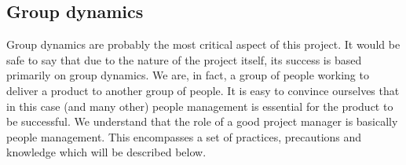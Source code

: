 \subsection{Group dynamics}

Group dynamics are probably the most critical aspect of this project.
It would be safe to say that due to the nature of the project itself, its success is based primarily on group dynamics.
We are, in fact, a group of people working to deliver a product to another group of people.
It is easy to convince ourselves that in this case (and many other) people management is essential for the product to be successful.
We understand that the role of a good project manager is basically people management.
This encompasses a set of practices, precautions and knowledge which will be described below.

